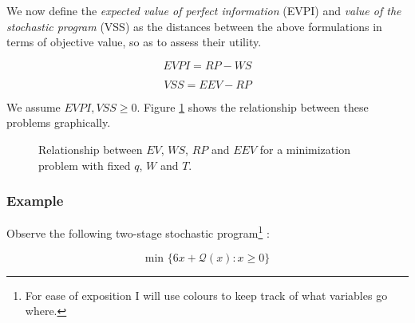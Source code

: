 We now define the \emph{expected value of perfect information} (EVPI) and \emph{value of
the stochastic program} (VSS) as the distances between the above formulations in terms
of objective value, so as to assess their utility.

\[
EVPI = RP - WS
\]

\[
VSS = EEV - RP
\]

We assume $EVPI, VSS \geq 0$.
Figure \ref{fig:valuesofsp} shows the relationship between these problems graphically.

\begin{figure}[h!]
\begin{center}
\caption{Relationship between $EV$, $WS$, $RP$ and $EEV$ for a minimization problem with fixed $q$, $W$ and $T$.}
\label{fig:valuesofsp}
\end{center}
\end{figure}

\subsubsection{Example}

Observe the following two-stage stochastic program\footnote{For ease of exposition I 
will use colours to keep track of what variables go where.} :

\[
\textrm{min } \{ 6x + \mathcal{Q}(x) : x\geq 0 \}
\]

